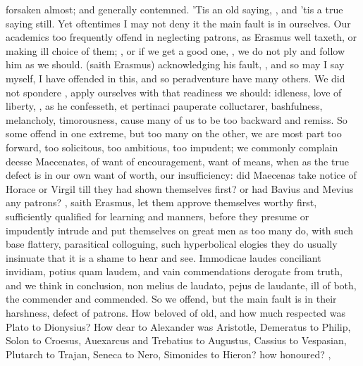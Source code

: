 {forsaken almost; and generally contemned. 'Tis an old saying, , and 'tis a true saying still.
Yet oftentimes I may not deny it the main fault is in ourselves. Our
academics too frequently offend in neglecting patrons, as Erasmus
well taxeth, or making ill choice of them; , or if we get a good one, , we do not ply and follow him as we should.
 (saith Erasmus) acknowledging his fault,
, and so may I say myself, I have offended
in this, and so peradventure have many others. We did not spondere
, apply ourselves with
that readiness we should: idleness, love of liberty, , as he confesseth, et
pertinaci pauperate colluctarer, bashfulness, melancholy, timorousness,
cause many of us to be too backward and remiss. So some offend in one
extreme, but too many on the other, we are most part too forward, too
solicitous, too ambitious, too impudent; we commonly complain deesse
Maecenates, of want of encouragement, want of means, when as the true
defect is in our own want of worth, our insufficiency: did Maecenas
take notice of Horace or Virgil till they had shown themselves first?
or had Bavius and Mevius any patrons? , saith
Erasmus, let them approve themselves worthy first, sufficiently
qualified for learning and manners, before they presume or impudently
intrude and put themselves on great men as too many do, with such base
flattery, parasitical colloguing, such hyperbolical elogies they do
usually insinuate that it is a shame to hear and see. Immodicae laudes
conciliant invidiam, potius quam laudem, and vain commendations
derogate from truth, and we think in conclusion, non melius de laudato,
pejus de laudante, ill of both, the commender and commended. So we
offend, but the main fault is in their harshness, defect of patrons.
How beloved of old, and how much respected was Plato to Dionysius? How
dear to Alexander was Aristotle, Demeratus to Philip, Solon to Croesus,
Auexarcus and Trebatius to Augustus, Cassius to Vespasian, Plutarch to
Trajan, Seneca to Nero, Simonides to Hieron? how honoured?
,

}
